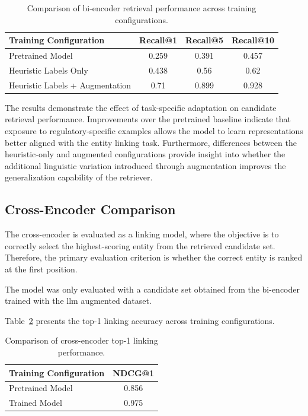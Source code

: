 \begin{table}[H]
\centering
\caption{Comparison of bi-encoder retrieval performance across training configurations.}
\label{tab:biencoder_comparison2}

\begin{tabular}{lccc}
\hline
\textbf{Training Configuration} & \textbf{Recall@1} & \textbf{Recall@5} & \textbf{Recall@10} \\
\hline
Pretrained Model & 0.259 & 0.391 & 0.457 \\
Heuristic Labels Only & 0.438 & 0.56 & 0.62 \\
Heuristic Labels + Augmentation & 0.71 & 0.899 & 0.928 \\
\hline
\end{tabular}
\end{table}


The results demonstrate the effect of task-specific adaptation on candidate retrieval performance. Improvements over the pretrained baseline indicate that exposure to regulatory-specific examples allows the model to learn representations better aligned with the entity linking task. Furthermore, differences between the heuristic-only and augmented configurations provide insight into whether the additional linguistic variation introduced through augmentation improves the generalization capability of the retriever.


\subsection{Cross-Encoder Comparison}

The cross-encoder is evaluated as a linking model, where the objective is to correctly select the highest-scoring entity from the retrieved candidate set. Therefore, the primary evaluation criterion is whether the correct entity is ranked at the first position.

The model was only evaluated with a candidate set obtained from the bi-encoder trained with the llm augmented dataset.

Table~\ref{tab:crossencoder_comparison} presents the top-1 linking accuracy across training configurations.

\begin{table}[H]
\centering
\caption{Comparison of cross-encoder top-1 linking performance.}
\label{tab:crossencoder_comparison}

\begin{tabular}{lc}
\hline
\textbf{Training Configuration} & \textbf{NDCG@1} \\
\hline
Pretrained Model & 0.856 \\
Trained Model & 0.975 \\
\hline
\end{tabular}
\end{table}

